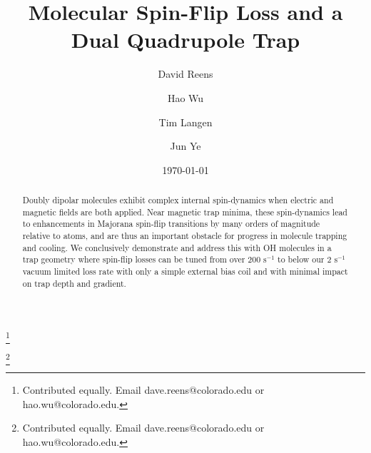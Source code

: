 \documentclass[%
 reprint,
 amsmath,amssymb,
 aps,
prl,
]{revtex4-1}
\begin{document}

\title{Molecular Spin-Flip Loss and a Dual Quadrupole Trap}%

\author{David Reens}
\thanks{Contributed equally. Email dave.reens@colorado.edu or hao.wu@colorado.edu.}

\author{Hao Wu}
\thanks{Contributed equally. Email dave.reens@colorado.edu or hao.wu@colorado.edu.}

\author{Tim Langen}%

\author{Jun Ye}


\date{\today}


\begin{abstract}
Doubly dipolar molecules exhibit complex internal spin-dynamics when electric and magnetic fields are both applied.
Near magnetic trap minima, these spin-dynamics lead to enhancements in Majorana spin-flip transitions by many orders of magnitude relative to atoms, and are thus an important obstacle for progress in molecule trapping and cooling.
We conclusively demonstrate and address this with OH molecules in a trap geometry where spin-flip losses can be tuned from over $200 \text{ s}^{-1} $ to below our $2\text{ s}^{-1}$ vacuum limited loss rate with only a simple external bias coil and with minimal impact on trap depth and gradient.
\end{abstract}


\maketitle


\end{document}

